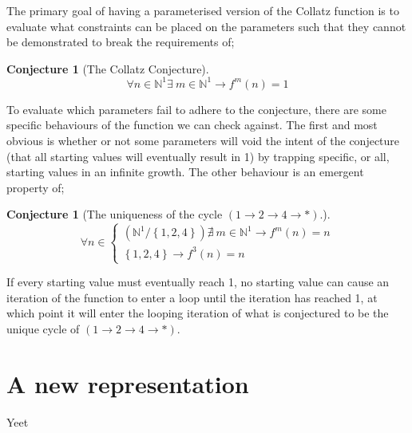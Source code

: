\documentclass[12pt,a4paper]{amsart}
\numberwithin{equation}{section}
\theoremstyle{plain}
\theoremstyle{definition}
\newtheorem{Conj}[Th]{Conjecture}
\begin{document}
The primary goal of having a parameterised version of the Collatz function is to evaluate what constraints can be placed on the parameters such that they cannot be demonstrated to break the requirements of;
\begin{Conj}[The Collatz Conjecture]
\begin{equation}
\forall n \in \mathbb{N}^{1} \exists \: m \in \mathbb{N}^{1} \rightarrow f^{m}\left ( n \right )=1
\end{equation}
\end{Conj}

To evaluate which parameters fail to adhere to the conjecture, there are some specific behaviours of the function we can check against. The first and most obvious is whether or not some parameters will void the intent of the conjecture (that all starting values will eventually result in 1) by trapping specific, or all, starting values in an infinite growth. The other behaviour is an emergent property of;
\begin{Conj}[The uniqueness of the cycle $ \left ( 1\rightarrow 2\rightarrow 4\rightarrow * \right ) $.]
\begin{equation}
\forall n \in \left\{\begin{matrix}
\left ( \mathbb{N}^{1}/\left \{ 1,2,4 \right \} \right ) \nexists \: m \in \mathbb{N}^{1} \rightarrow f^{m}\left ( n \right )=n \\ 
\left \{ 1,2,4 \right \} \rightarrow f^{3}\left ( n \right )=n
\end{matrix} \right.
\end{equation}
\end{Conj}
If every starting value must eventually reach 1, no starting value can cause an iteration of the function to enter a loop until the iteration has reached 1, at which point it will enter the looping iteration of what is conjectured to be the unique cycle of $ \left ( 1\rightarrow 2\rightarrow 4\rightarrow * \right ) $.

\section{A new representation}
	Yeet
\end{document}
